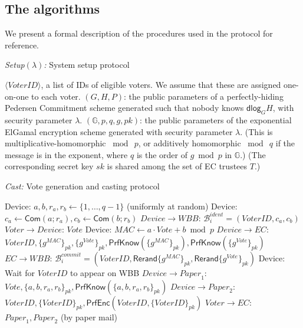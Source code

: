 \documentclass[12pt,a4paper]{article}
\newcommand{\commit}{\mathsf{Com}}
\newcommand{\PrfEnc}{\mathsf{PrfEnc}}
\newcommand{\PrfKnow}{\mathsf{PrfKnow}}
\newcommand{\rerand}{\mathsf{Rerand}}
\newcommand{\dlog}{\mathsf{dlog}}
\theoremstyle{definition}
\newcommand{\Vote}{\mathit{Vote}}
\newcommand{\VoterID}{\mathit{VoterID}}
\newcommand{\Paper}{\mathit{Paper}}
\newcommand{\Mac}{\mathit{MAC}}
\newcommand{\Wbb}{\mathit{WBB}}
\begin{document}
\subsection{The algorithms}\label{app-algorithms}
We present a formal description of the procedures used in the protocol for reference.
\singlespacing
\begin{algorithm} 	\caption{\textit{Setup}$(\lambda)$\textit{:} System setup protocol}
	\begin{algorithmic}[1]
\State $\langle \VoterID \rangle$, a list of IDs of eligible voters.  We assume that these are assigned one-on-one to each voter.
\State	$(G,H,P)$: the public parameters of a perfectly-hiding Pedersen Commitment scheme  generated such that nobody knows $\dlog_G H$, with security parameter $\lambda$.
\State $(\mathbb{G}, p, q, g, pk)$: the public parameters of the exponential ElGamal encryption scheme generated with security parameter $\lambda$.
(This is multiplicative-homomorphic $\bmod\ p$, or additively homomorphic $\bmod\ q$ if the message is in the exponent, where $q$ is the order of $g\bmod p$ in $\mathbb{G}$.)
\State  (The corresponding secret key  $sk$ is shared among the set of EC trustees $T$.)
\end{algorithmic}
	\label{fig:setup}
\end{algorithm}
\begin{algorithm} 	\caption{\textit{Cast:} Vote generation and casting protocol}
	\begin{algorithmic}[1]
	\State Device: $a,b,r_a,r_b\leftarrow\{1,\ldots,q-1\}$ (uniformly at random)
	\State Device: $c_a\leftarrow\commit(a;r_a), c_b\leftarrow\commit(b;r_b)$
	\State $Device\rightarrow \Wbb$: $\mathcal{B}^{ident}_i=(\VoterID, c_a, c_b)$\label{Step:VoterCommit}
	\State $Voter\rightarrow Device$: $\Vote$
	\State Device: $\Mac\leftarrow a\cdot Vote+b\bmod p$
	\State $Device\rightarrow EC$: $\VoterID, \{g^\Mac\}_{pk}, \{g^\Vote\}_{pk}, \PrfKnow(\{g^\Mac\}_{pk}), \PrfKnow(\{g^\Vote\}_{pk})$%
	\State $EC\rightarrow \Wbb$: $\mathcal{B}^{commit}_i=(\VoterID, \rerand\{g^\Mac\}_{pk}, \rerand\{g^\Vote\}_{pk})$ \label{Step:ECPostsVoteMAC}
	\State Device: Wait for $\VoterID$ to appear on WBB
	\State $Device\rightarrow \Paper_1$: $\Vote, \{a,b,r_a,r_b\}_{pk}, \PrfKnow(\{a,b,r_a,r_b\}_{pk})$
	\State $Device\rightarrow \Paper_2$: $\VoterID, \{\VoterID\}_{pk}, \PrfEnc(\VoterID, \{\VoterID\}_{pk})$
	\State $Voter\rightarrow EC$: $\Paper_1, \Paper_2$ (by paper mail)
	\end{algorithmic}
\label{fig:genAndCasting}
\end{algorithm}
\end{document}
